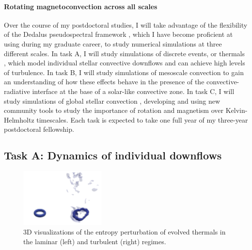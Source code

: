 \documentclass[11pt, preprint]{aastex}
\begin{document}
\paragraph{Rotating magnetoconvection across all scales}
Over the course of my postdoctoral studies, I will take advantage of the flexibility of the Dedalus pseudospectral framework \citep{burns&all2019}, which I have become proficient at using during my graduate career, to study numerical simulations at three different scales.
In task A, I will study simulations of discrete events, or thermals \citep[as in][]{andersLB2019}, which model individual stellar convective downflows and can achieve high levels of turbulence.
In task B, I will study simulations of mesoscale convection \citep[as in][]{anders&brown2017} to gain an understanding of how these effects behave in the presence of the convective-radiative interface at the base of a solar-like convective zone.
In task C, I will study simulations of global stellar convection \citep[as in][]{lecoanet&all2019}, developing and using new community tools to study the importance of rotation and magnetism over Kelvin-Helmholtz timescales.
Each task is expected to take one full year of my three-year postdoctoral fellowship.

\vspace{-0.8cm}
\subsection*{Task A: Dynamics of individual downflows}
\vspace{-0.3cm}
\label{sct:taskA}
\begin{figure}
	\begin{center}
	\vspace{-10pt}
    \includegraphics[width=0.38\textwidth]{./figs/thermals_comparison.png}
	\vspace{-16pt}
	\end{center}
    \caption{
	3D visualizations of the entropy perturbation of evolved thermals in the laminar (left) and turbulent (right) regimes.
	\label{fig:thermals_comparison} }
	\vspace{-11pt}
\end{figure}
\end{document}
